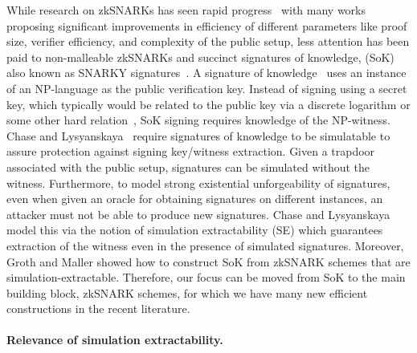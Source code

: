 While research on zkSNARKs has seen rapid
progress~\cite{EC:GGPR13,AC:Groth10a,TCC:Lipmaa12,TCC:BCIOP13,SP:PHGR13,C:BCGTV13,AC:Lipmaa13,USENIX:BCTV14,EC:Groth16}
with many works proposing significant improvements in efficiency of different
parameters like proof size, verifier efficiency, and complexity of the public setup,
less attention has been paid to non-malleable zkSNARKs and succinct signatures of
knowledge, (SoK) also known as SNARKY signatures~\cite{C:GroMal17,EPRINT:BKSV20}. A
signature of knowledge~\cite{C:CamSta97,C:ChaLys06} uses an instance of an
NP-language as the public verification key. Instead of signing using a secret key,
which typically would be related to the public key via a discrete logarithm or some
other hard relation~\cite{AC:DHLW10}, SoK signing requires knowledge of the
NP-witness. Chase and Lysyanskaya~\cite{C:ChaLys06} require signatures of knowledge
to be simulatable to assure protection against signing key/witness extraction. Given
a trapdoor associated with the public setup, signatures can be simulated without the
witness. Furthermore, to model strong existential unforgeability of signatures, even
when given an oracle for obtaining signatures on different instances, an attacker
must not be able to produce new signatures. Chase and Lysyanskaya model this via the
notion of simulation extractability (SE) which guarantees extraction of the witness
even in the presence of simulated signatures.  Moreover, Groth and Maller
\cite{C:GroMal17} showed how to construct SoK from zkSNARK schemes that are
simulation-extractable.  Therefore, our focus can be moved from SoK to the main
building block, zkSNARK schemes, for which we have many new efficient constructions
in the recent literature.
 

\paragraph{Relevance of simulation extractability.}

